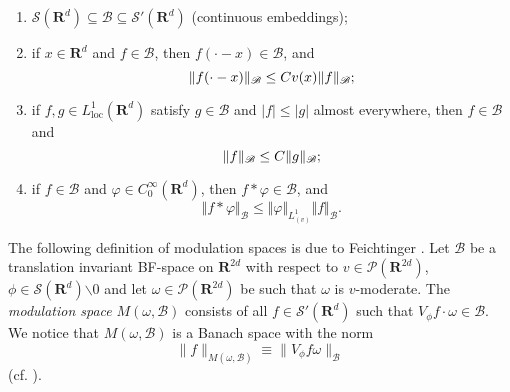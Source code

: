 \documentclass[12pt,a4paper,reqno]{amsart}
\numberwithin{equation}{section}
\numberwithin{thm}{section}
\theoremstyle{definition}
\theoremstyle{remark}
\begin{document}
\begin{enumerate}
\item $\mathscr S({\mathbf R^{d}})\subseteq \mathscr
B\subseteq \mathscr S'({\mathbf R^{d}})$ (continuous embeddings);

{\vspace{0.1cm}}

\item if $x\in {\mathbf R^{d}}$ and $f\in \mathscr B$, then $f(\cdot -x)\in
\mathscr B$, and
\begin{equation}\label{translmultprop1}
{\Vert {f(\cdot-x)}\Vert _{{\mathscr B}}}\le Cv(x){\Vert {f}\Vert _{{\mathscr B}}}\text ;
\end{equation}

{\vspace{0.1cm}}

\item if  $f,g\in L^1_{\mathrm{loc}}({\mathbf R^{d}})$ satisfy $g\in \mathscr B$
and $|f| \le |g|$ almost everywhere, then $f\in \mathscr B$ and
$$
{\Vert f\Vert _{{\mathscr B}}}\le C{\Vert g\Vert _{{\mathscr B}}}\text ;
$$

{\vspace{0.1cm}}

\item if $f\in \mathscr B$ and ${\varphi}\in C^\infty_0({\mathbf R^{d}})$, then $f*{\varphi}\in\mathscr B$, and 
\begin{equation}\label{BFconvEst}
{\Vert {f*{\varphi}}\Vert _{{\mathscr B}}}\leq {\Vert {\varphi}\Vert _{{L^1_{(v)}}}} {\Vert {f}\Vert _{{\mathscr B}}}.
\end{equation}
\end{enumerate}

The following definition of modulation spaces is due to Feichtinger \cite{Feichtinger6}.
Let $\mathscr{B}$ be a translation invariant BF-space on
${\mathbf R^{{2d}}}$ with respect to $v\in \mathscr P({\mathbf R^{{2d}}})$,
$\phi \in \mathscr{S}({\mathbf R^{{d}}}){\backslash {{0}}}$ and let $\omega \in
\mathscr{P}({\mathbf R^{{2d}}})$ be such that $\omega$ is $v$-moderate.
The \emph{modulation space} $M(\omega ,\mathscr B)$ consists of all $f\in
\mathscr{S}'({\mathbf R^{{d}}})$ such that $V_{\phi}f\cdot \omega \in
\mathscr{B}$. We notice that $M(\omega ,\mathscr B)$ is a Banach space
with the norm
\begin{equation}\label{modnorm}
\|f\|_{M(\omega ,\mathscr B)} \equiv \|V_{\phi} f
\omega\|_{\mathscr{B}}
\end{equation}
(cf. \cite{Feichtinger3}).
\end{document}
